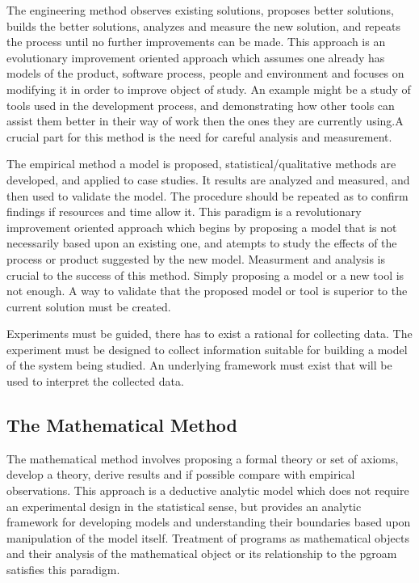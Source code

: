 The engineering method observes existing solutions, proposes better solutions, builds the better solutions, analyzes and measure the new solution, and repeats the process until no further improvements can be made. This approach is an evolutionary improvement oriented approach which assumes one already has models of the product, software process, people and environment and focuses on modifying it in order to improve object of study. An example might be a study of tools used in the development process, and demonstrating how other tools can assist them better in their way of work then the ones they are currently using.A crucial part for this method is the need for careful analysis and measurement.

The empirical method a model is proposed, statistical/qualitative methods are developed, and applied to case studies. It results are analyzed and measured, and then used to validate the model. The procedure should be repeated as to confirm findings if resources and time allow it. This paradigm is a revolutionary improvement oriented approach which begins by proposing a model that is not necessarily based upon an existing one, and atempts to study the effects of the process or product suggested by the new model. Measurment and analysis is crucial to the success of this method. Simply proposing a model or a new tool is not enough. A way to validate that the proposed model or tool is superior to the current solution must be created.

Experiments must be guided, there has to exist a rational for collecting data. The experiment must be designed to collect information suitable for building a model of the system being studied. An underlying framework must exist that will be used to interpret the collected data.

\subsection{The Mathematical Method}
The mathematical method involves proposing a formal theory or set of axioms, develop a theory, derive results and if possible compare with empirical observations. This approach is a deductive analytic model which does not require an experimental design in the statistical sense, but provides an analytic framework for developing models and understanding their boundaries based upon manipulation of the model itself. Treatment of programs as mathematical objects and their analysis of the mathematical object or its relationship to the pgroam satisfies this paradigm.


